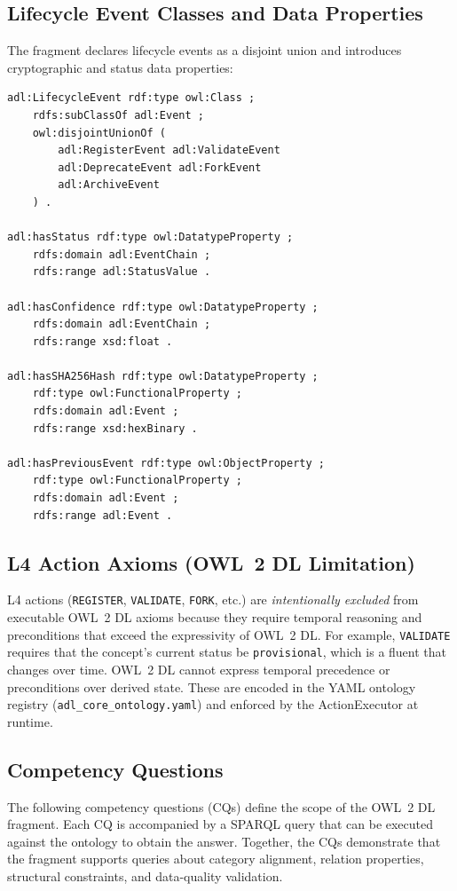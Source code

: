 \subsection{Lifecycle Event Classes and Data Properties}

The fragment declares lifecycle events as a disjoint union and introduces cryptographic and status data properties:
\begin{verbatim}
adl:LifecycleEvent rdf:type owl:Class ;
    rdfs:subClassOf adl:Event ;
    owl:disjointUnionOf (
        adl:RegisterEvent adl:ValidateEvent
        adl:DeprecateEvent adl:ForkEvent
        adl:ArchiveEvent
    ) .

adl:hasStatus rdf:type owl:DatatypeProperty ;
    rdfs:domain adl:EventChain ;
    rdfs:range adl:StatusValue .

adl:hasConfidence rdf:type owl:DatatypeProperty ;
    rdfs:domain adl:EventChain ;
    rdfs:range xsd:float .

adl:hasSHA256Hash rdf:type owl:DatatypeProperty ;
    rdf:type owl:FunctionalProperty ;
    rdfs:domain adl:Event ;
    rdfs:range xsd:hexBinary .

adl:hasPreviousEvent rdf:type owl:ObjectProperty ;
    rdf:type owl:FunctionalProperty ;
    rdfs:domain adl:Event ;
    rdfs:range adl:Event .
\end{verbatim}

\subsection{L4 Action Axioms (OWL~2 DL Limitation)}

L4 actions (\texttt{REGISTER}, \texttt{VALIDATE}, \texttt{FORK}, etc.) are \emph{intentionally excluded} from executable OWL~2 DL axioms because they require temporal reasoning and preconditions that exceed the expressivity of OWL~2 DL. For example, \texttt{VALIDATE} requires that the concept's current status be \texttt{provisional}, which is a fluent that changes over time. OWL~2 DL cannot express temporal precedence or preconditions over derived state. These are encoded in the YAML ontology registry (\texttt{adl\_core\_ontology.yaml}) and enforced by the ActionExecutor at runtime.

\subsection{Competency Questions}

The following competency questions (CQs) define the scope of the OWL~2 DL fragment. Each CQ is accompanied by a SPARQL query that can be executed against the ontology to obtain the answer. Together, the CQs demonstrate that the fragment supports queries about category alignment, relation properties, structural constraints, and data-quality validation.

